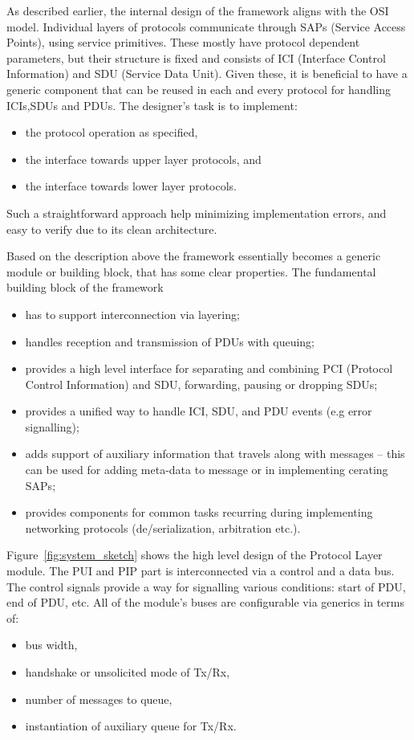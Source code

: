 \documentclass[conference]{IEEEtran}
\begin{document}
As described earlier, the internal design of the framework aligns with the OSI model. Individual layers of protocols communicate through SAPs (Service Access Points), using service primitives.
These mostly have protocol dependent parameters, but their structure is fixed and consists of ICI (Interface Control Information) and SDU (Service Data Unit). Given these, it is beneficial to have a generic component that can be reused in each and every protocol for handling ICIs,SDUs and PDUs. The designer's task is to implement:
\begin{itemize}
\renewcommand \labelitemi{--}
\item the protocol operation as specified,
\item the interface towards upper layer protocols, and
\item the interface towards lower layer protocols.
\end{itemize}

Such a straightforward approach help minimizing implementation errors, and easy to verify due to its clean architecture.

Based on the description above the framework essentially becomes a generic module or building block, that has some clear properties. The fundamental building block of the framework

\begin{itemize}
\renewcommand \labelitemi{--}
\item has to support interconnection via layering;
\item handles reception and transmission of PDUs with queuing; 
\item provides a high level interface for separating and combining PCI (Protocol Control Information) and SDU, forwarding, pausing or dropping SDUs;
\item provides a unified way to handle ICI, SDU, and PDU events (e.g error signalling);
\item adds support of auxiliary information that travels along with messages -- this can be used for adding meta-data to message or in implementing cerating SAPs;
\item provides components for common tasks recurring during implementing networking protocols (de/serialization, arbitration etc.).
\end{itemize}

Figure~\ref{fig:system_sketch} shows the high level design of the Protocol Layer module. The PUI and PIP part is interconnected via a control and a data bus. The control signals provide a way for signalling various conditions: start of PDU, end of PDU, etc. All of the module's buses are configurable via generics in terms of:
\begin{itemize}
\renewcommand \labelitemi{--}
\item bus width,
\item handshake or unsolicited mode of Tx/Rx,
\item number of messages to queue,
\item instantiation of auxiliary queue for Tx/Rx.
\end{itemize}
\end{document}
